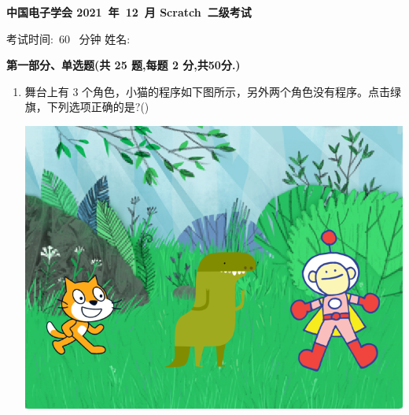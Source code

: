 \documentclass[10pt, a4paper]{article}
\newcommand{\Title}[3]{
    \begin{center}
        \Large \textbf{中国电子学会 #1~年~#2~月 Scratch~#3级考试}
    \end{center}
}
\newcommand{\TimeAndName}[1]{
    \begin{center}
        考试时间:~#1~ 分钟 \qquad\qquad\qquad\qquad 姓名:\underline{\quad\quad\quad\quad}
    \end{center}
}
\begin{document}
    \Title{2021}{12}{二} %
    \TimeAndName{60} %

    \vspace{2mm}
    {\noindent\textbf{第一部分、单选题(共 25 题,每题 2 分,共50分.)}}
    \begin{enumerate}
        \item 舞台上有 3 个角色，小猫的程序如下图所示，另外两个角色没有程序。点击绿旗，下列选项正确的是?(\qquad)
        
        \begin{minipage}{.32\textwidth}
            \centering
            \begin{minipage}[t]{.6\textwidth}
                \centering
                \includegraphics[width=\textwidth]{1-1.png}
            \end{minipage}
            \begin{minipage}[t]{.35\textwidth}
                \centering

\end{minipage}
\end{minipage}
\end{enumerate}
\end{document}
